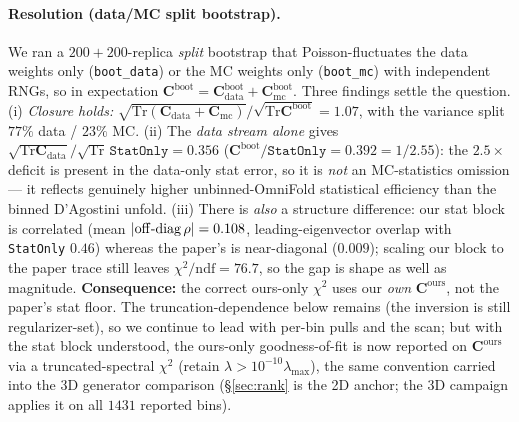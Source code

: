 \documentclass[12pt]{article}
\newcommand{\ours}{\text{ours}}
\newcommand{\boot}{\text{boot}}
\newcommand{\Tr}{\mathrm{Tr}}
\begin{document}
\paragraph{Resolution (data/MC split bootstrap).}
We ran a $200{+}200$-replica \emph{split} bootstrap that Poisson-fluctuates the
data weights only (\texttt{boot\_data}) or the MC weights only (\texttt{boot\_mc})
with independent RNGs, so in expectation
$\mathbf{C}^{\boot}=\mathbf{C}^{\boot}_{\mathrm{data}}+\mathbf{C}^{\boot}_{\mathrm{mc}}$.
Three findings settle the question. (i) \emph{Closure holds:}
$\sqrt{\Tr(\mathbf{C}_{\mathrm{data}}+\mathbf{C}_{\mathrm{mc}})}/
\sqrt{\Tr\mathbf{C}^{\boot}}=1.07$, with the variance split $77\%$ data /
$23\%$ MC. (ii) The \emph{data stream alone} gives
$\sqrt{\Tr\mathbf{C}_{\mathrm{data}}}/\sqrt{\Tr}\,\texttt{StatOnly}=0.356$
($\mathbf{C}^{\boot}/\texttt{StatOnly}=0.392=1/2.55$): the $2.5\times$ deficit is
present in the data-only stat error, so it is \emph{not} an MC-statistics
omission --- it reflects genuinely higher unbinned-OmniFold statistical
efficiency than the binned D'Agostini unfold. (iii) There is \emph{also} a
structure difference: our stat block is correlated (mean
$|{\rm off\text{-}diag}\,\rho|=0.108$, leading-eigenvector overlap with
\texttt{StatOnly} $0.46$) whereas the paper's is near-diagonal ($0.009$); scaling
our block to the paper trace still leaves $\chi^{2}/\mathrm{ndf}=76.7$, so the gap
is shape as well as magnitude. \textbf{Consequence:} the correct ours-only
$\chi^{2}$ uses our \emph{own} $\mathbf{C}^{\ours}$, not the paper's stat floor.
The truncation-dependence below remains (the inversion is still regularizer-set),
so we continue to lead with per-bin pulls and the scan; but with the stat block
understood, the ours-only goodness-of-fit is now reported on $\mathbf{C}^{\ours}$
via a truncated-spectral $\chi^{2}$ (retain $\lambda>10^{-10}\lambda_{\max}$), the
same convention carried into the 3D generator comparison (\S\ref{sec:rank} is the
2D anchor; the 3D campaign applies it on all $1431$ reported bins).
\end{document}
